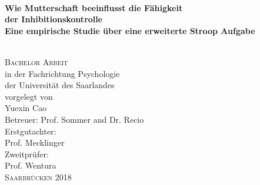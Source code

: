 \begin{titlepage}
        \thispagestyle{empty}
   \begin{adjustwidth}{-3cm}{-3cm}



\begin{center}

\vspace*{.06\textheight}

\HRule \\[0.3cm] %
{\huge \bfseries
Wie Mutterschaft beeinflusst die Fähigkeit \\der Inhibitionskontrolle \\
\vspace{0.2cm}
\Large Eine empirische Studie über
        eine erweiterte Stroop Aufgabe \par}\vspace{0.3cm} %
\HRule \\[3cm] %

\textsc{\Large Bachelor Arbeit}\\[0.3cm] %
        {\large in der Fachrichtung Psychologie}\\
[0.3cm]
{\large der \Large Universität des Saarlandes}\\
[1.5cm]
{\normalsize vorgelegt von}\\
[0.2cm]
{\Large Yuexin Cao}\\
[1.5cm]
Betreuer: Prof. Sommer and Dr. Recio\\
[0.5cm]
Erstgutachter:\\ Prof. Mecklinger\\
[0.5cm]
Zweitprüfer:\\ Prof. Wentura\\


\vfill
{\large \scshape Saarbrücken 2018}
\end{center}
\end{adjustwidth}
\end{titlepage}